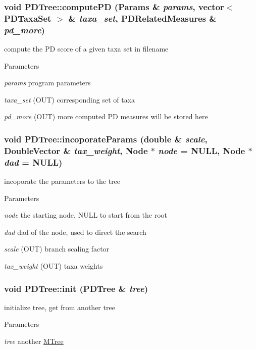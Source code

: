 \hypertarget{classPDTree_af35a390cd0d1e7d9b24447d356f99ed1}{
\subsubsection[{computePD}]{\setlength{\rightskip}{0pt plus 5cm}void PDTree::computePD ({\bf Params} \& {\em params}, \/  vector$<$ {\bf PDTaxaSet} $>$ \& {\em taxa\_\-set}, \/  {\bf PDRelatedMeasures} \& {\em pd\_\-more})}}
\label{classPDTree_af35a390cd0d1e7d9b24447d356f99ed1}
compute the PD score of a given taxa set in filename 
\begin{DoxyParams}{Parameters}
\item[{\em params}]program parameters \item[{\em taxa\_\-set}](OUT) corresponding set of taxa \item[{\em pd\_\-more}](OUT) more computed PD measures will be stored here \end{DoxyParams}
\hypertarget{classPDTree_a9a4be8dc6c13aa51a188f17d04a8c492}{
\subsubsection[{incoporateParams}]{\setlength{\rightskip}{0pt plus 5cm}void PDTree::incoporateParams (double \& {\em scale}, \/  DoubleVector \& {\em tax\_\-weight}, \/  {\bf Node} $\ast$ {\em node} = {\ttfamily NULL}, \/  {\bf Node} $\ast$ {\em dad} = {\ttfamily NULL})}}
\label{classPDTree_a9a4be8dc6c13aa51a188f17d04a8c492}
incoporate the parameters to the tree 
\begin{DoxyParams}{Parameters}
\item[{\em node}]the starting node, NULL to start from the root \item[{\em dad}]dad of the node, used to direct the search \item[{\em scale}](OUT) branch scaling factor \item[{\em tax\_\-weight}](OUT) taxa weights \end{DoxyParams}
\hypertarget{classPDTree_a423ef933e7940c5c745e27898a394bfc}{
\subsubsection[{init}]{\setlength{\rightskip}{0pt plus 5cm}void PDTree::init ({\bf PDTree} \& {\em tree})}}
\label{classPDTree_a423ef933e7940c5c745e27898a394bfc}
initialize tree, get from another tree 
\begin{DoxyParams}{Parameters}
\item[{\em tree}]another \hyperlink{classMTree}{MTree} \end{DoxyParams}


